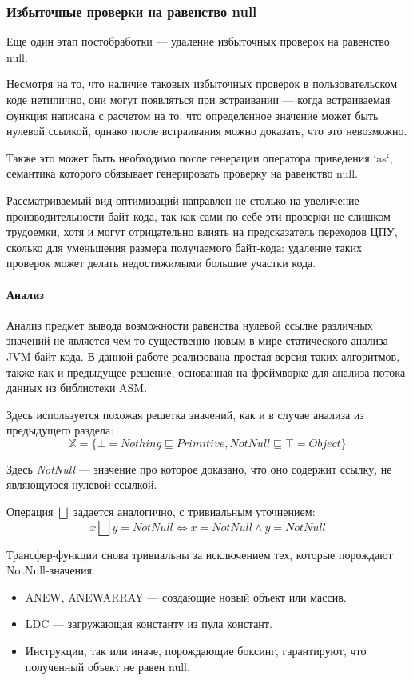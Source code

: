 \subsubsection{Избыточные проверки на равенство null}
Еще один этап постобработки --- удаление избыточных проверок на равенство null.

Несмотря на то, что наличие таковых избыточных проверок в пользовательском коде нетипично, они
могут появляться при встраивании --- когда встраиваемая функция написана с расчетом на то, что
определенное значение может быть нулевой ссылкой, однако после встраивания можно доказать, что
это невозможно.

Также это может быть необходимо после генерации оператора приведения `as`, семантика которого
обязывает генерировать проверку на равенство null.

Рассматриваемый вид оптимизаций направлен не столько на увеличение производительности байт-кода,
так как сами по себе эти проверки не слишком трудоемки, хотя и могут отрицательно влиять на
предсказатель переходов ЦПУ, сколько для уменьшения размера получаемого байт-кода: удаление
таких проверок может делать недостижимыми большие участки кода.

\paragraph{Анализ}
Анализ предмет вывода возможности равенства нулевой ссылке различных значений
не является чем-то существенно новым в мире статического анализа JVM-байт-кода.
В данной работе реализована простая версия таких алгоритмов, также как и предыдущее решение,
основанная на фреймворке для анализа потока данных из библиотеки ASM.

Здесь используется похожая решетка значений, как и в случае анализа из предыдущего раздела:
$$\mathbb{X} = \{\bot = Nothing \sqsubseteq  Primitive, NotNull \sqsubseteq \top = Object \}$$

Здесь \textit{NotNull} --- значение про которое доказано, что оно содержит ссылку, не являющуюся
нулевой ссылкой.

Операция $\bigsqcup$ задается аналогично, с тривиальным уточнением:
$$x \bigsqcup y = NotNull \Leftrightarrow x = NotNull \land y = NotNull$$

Трансфер-функции снова тривиальны за исключением тех, которые порождают NotNull-значения:
\begin{itemize}
    \item ANEW, ANEWARRAY --- создающие новый объект или массив.
    \item LDC --- загружающая константу из пула констант.
    \item Инструкции, так или иначе, порождающие боксинг, гарантируют, что полученный объект
    не равен null.
\end{itemize}

